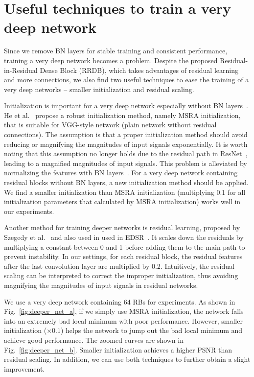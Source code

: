\documentclass[runningheads]{llncs}
\begin{document}
\section{Useful techniques to train a very deep network} \label{sec:useful_techniques}

Since we remove BN layers for stable training and consistent performance, training a very deep network becomes a 
problem. 
%
Despite the proposed Residual-in-Residual Dense Block (RRDB), which takes advantages of residual learning and more 
connections, we also find two useful techniques to ease the training of a very deep networks -- smaller initialization 
and 
residual scaling. 
%

Initialization is important for a very deep network especially without BN 
layers~\cite{glorot2010understanding,he2015delving}.
%
He et al.~\cite{he2015delving} propose a robust initialization method, namely MSRA initialization, 
that is suitable for VGG-style network (plain network \mbox{without} residual connections). 
%
The assumption is that a proper initialization method should avoid reducing or magnifying the magnitudes of input 
signals exponentially.
%
It is worth noting that this assumption no longer holds due to the residual path in ResNet~\cite{he2016deep}, leading 
to a magnified magnitudes of input signals.
%
This problem is alleviated by normalizing the features with BN layers~\cite{ioffe2015batch}.
%
For a very deep network containing residual blocks without BN layers, a new initialization method should be applied. 
We find a smaller initialization than MSRA initialization (multiplying 0.1 for all initialization parameters 
that calculated by MSRA initialization) works well in our experiments.

Another method for training deeper networks is residual learning, proposed by Szegedy et 
al.~\cite{szegedy2016inception} and also used in used in EDSR~\cite{lim2017enhanced}.
%
It scales down the residuals by multiplying a constant between 0 and 1 before adding them to the main path to prevent 
instability. In our settings, for each residual block, the residual features after the last convolution layer are 
multiplied by 0.2.
%
Intuitively, the residual scaling can be interpreted to correct the improper initialization, thus avoiding magnifying 
the magnitudes of input signals in residual networks.

We use a very deep network containing 64 RBs for experiments. As shown in Fig.~\ref{fig:deeper_net_a}, if we simply 
use MSRA initialization, the network falls into an extremely bad local minimum with poor performance. 
However, smaller initialization ($\times 0.1$) helps the network to jump out the bad local minimum and achieve good 
performance.
%
The zoomed curves are shown in Fig.~\ref{fig:deeper_net_b}. Smaller initialization achieves a higher PSNR than residual 
scaling. In addition, we can use both techniques to further obtain a slight improvement. 
\end{document}

